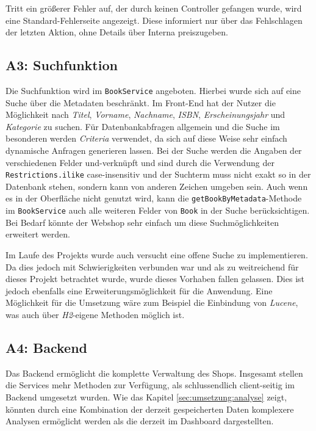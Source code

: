 		Tritt ein größerer Fehler auf, der durch keinen Controller gefangen wurde, wird eine Standard-Fehlerseite angezeigt. Diese informiert nur über das Fehlschlagen der letzten Aktion, ohne Details über Interna preiszugeben.

	\subsection{A3: Suchfunktion}\label{umsetzung:Suche}
	Die Suchfunktion wird im \texttt{BookService} angeboten. Hierbei wurde sich auf eine Suche über die Metadaten beschränkt. Im Front-End hat der Nutzer die Möglichkeit nach \textit{Titel}, \textit{Vorname}, \textit{Nachname}, \textit{ISBN}, \textit{Erscheinungsjahr} und \textit{Kategorie} zu suchen. Für Datenbankabfragen allgemein und die Suche im besonderen werden \textit{Criteria} verwendet, da sich auf diese Weise sehr einfach dynamische Anfragen generieren lassen. Bei der Suche werden die Angaben der verschiedenen Felder und-verknüpft und sind durch die Verwendung der \texttt{Restrictions.ilike} case-insensitiv und der Suchterm muss nicht exakt so in der Datenbank stehen, sondern kann von anderen Zeichen umgeben sein.
	Auch wenn es in der Oberfläche nicht genutzt wird, kann die \texttt{getBookByMetadata}-Methode im \texttt{BookService} auch alle weiteren Felder von \texttt{Book} in der Suche berücksichtigen. Bei Bedarf könnte der Webshop sehr einfach um diese Suchmöglichkeiten erweitert werden.
	
	Im Laufe des Projekts wurde auch versucht eine offene Suche zu implementieren. Da dies jedoch mit Schwierigkeiten verbunden war und als zu weitreichend für dieses Projekt betrachtet wurde, wurde dieses Vorhaben fallen gelassen. Dies ist jedoch ebenfalls eine Erweiterungsmöglichkeit für die Anwendung. Eine Möglichkeit für die Umsetzung wäre zum Beispiel die Einbindung von \textit{Lucene}, was auch über \textit{H2}-eigene Methoden möglich ist.

	\subsection{A4: Backend}\label{sec:umsetzung:backend}
	Das Backend ermöglicht die komplette Verwaltung des Shops. Insgesamt stellen die Services mehr Methoden zur Verfügung, als schlussendlich client-seitig im Backend umgesetzt wurden. Wie das Kapitel \ref{sec:umsetzung:analyse} zeigt, könnten durch eine Kombination der derzeit gespeicherten Daten komplexere Analysen ermöglicht werden als die derzeit im Dashboard dargestellten.
	

